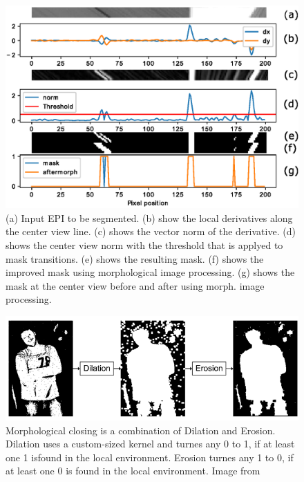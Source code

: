 \documentclass  [
  paper    = a4,
  BCOR     = 10mm,
  twoside,
  fontsize = 12pt,
  fleqn,
  toc      = bibnumbered,
  toc      = listofnumbered,
  numbers  = noendperiod,
  headings = normal,
  listof   = leveldown,
  version  = 3.03
]                                       {scrreprt}
\begin{document}
\begin{figure}
	\centering
	\includegraphics[width=1\linewidth]{images/derivatives_full}
	\caption[Segmentating an EPI]{(a) Input EPI to be segmented. (b) show the local derivatives along the center view line. (c) shows the vector norm of the derivative. (d) shows the center view norm with the threshold that is applyed to mask transitions. (e) shows the resulting mask. (f) shows the improved mask using morphological image processing. (g) shows the mask at the center view before and after using morph. image processing. }
	\label{fig:derivativesfull}

\end{figure}
\begin{figure}
	\centering
	\includegraphics[width=0.7\linewidth]{images/closing}
	\caption[Morphological closing]{Morphological closing is a combination of Dilation and Erosion. Dilation uses a custom-sized kernel and turnes any 0 to 1, if at least one 1 isfound in the local environment. Erosion turnes any 1 to 0, if at least one 0 is found in the local environment. Image from \cite{what-when-how.com}}
	\label{fig:closing}
\end{figure}
\end{document}
